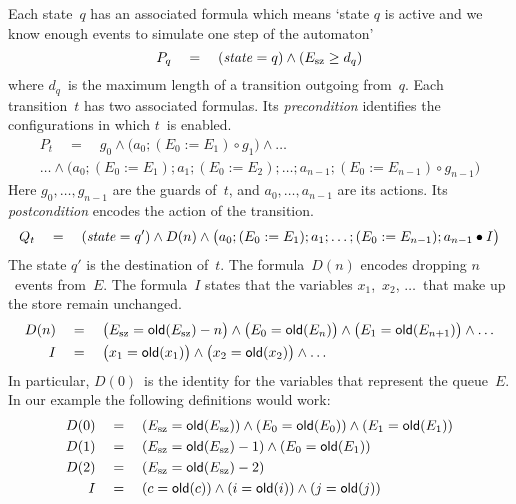 \documentclass{article} %
\begin{document}
Each state~$q$ has an associated formula which means `state $q$ is active and we know enough events to simulate one step of the automaton'
\[ P_q \quad=\quad ({\it state}=q) \land (E_{\rm sz}\ge d_q) \]
where $d_q$~is the maximum length of a transition outgoing from~$q$.
Each transition~$t$ has two associated formulas.
Its \emph{precondition} identifies the configurations in which $t$~is enabled.
\begin{multline*}
P_t \quad=\quad
    g_0
    \land\bigl(a_0;(E_0:=E_1)\circ g_1\bigr)
    \land\ldots\\\ldots
    \land\bigl(a_0;(E_0:=E_1);a_1;(E_0:=E_2);\ldots;a_{n-1};(E_0:=E_{n-1})\circ g_{n-1}\bigr)
\end{multline*}
Here $g_0,\ldots,g_{n-1}$ are the guards of~$t$, and $a_0,\ldots,a_{n-1}$ are its actions.
Its \emph{postcondition} encodes the action of the transition.
\[ Q_t \quad=\quad
  ({\it state}=q')
  \land D(n)
  \land \bigl(a_0;(E_0:=E_1);a_1;\ldots;(E_0:=E_{n-1});a_{n-1}\bullet I\bigr)
  \]
The state $q'$ is the destination of~$t$.
The formula~$D(n)$ encodes dropping $n$~events from~$E$.
The formula~$I$ states that the variables $x_1$,~$x_2$, $\ldots$~that make up the store remain unchanged.
\begin{align*}
D(n) \quad&=\quad
  \bigl(E_{\rm sz}={\sf old}(E_{\rm sz})-n\bigr)
  \land\bigl(E_0={\sf old}(E_n)\bigr)
  \land\bigl(E_1={\sf old}(E_{n+1})\bigr)
  \land\ldots\\
I \quad&=\quad
  \bigl(x_1={\sf old}(x_1)\bigr)
  \land\bigl(x_2={\sf old}(x_2)\bigr)
  \land\ldots
\end{align*}
In particular, $D(0)$~is the identity for the variables that represent the queue~$E$.
In our example the following definitions would work:
{\def\=#1{(#1={\sf old}(#1))}
\begin{align*}
D(0) \quad&=\quad \={E_{\rm sz}}\land\={E_0}\land\={E_1} \\
D(1) \quad&=\quad (E_{\rm sz}={\sf old}(E_{\rm sz})-1)\land(E_0={\sf old}(E_1)) \\
D(2) \quad&=\quad (E_{\rm sz}={\sf old}(E_{\rm sz})-2) \\
I \quad&=\quad \=c\land\=i\land\=j
\end{align*}}
\end{document}
